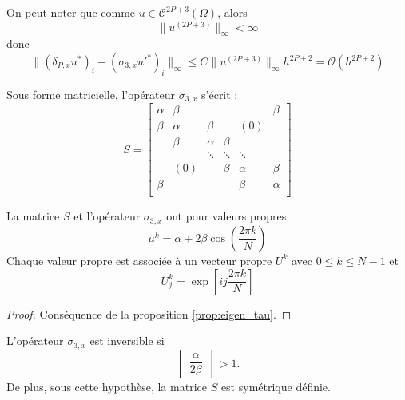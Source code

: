 On peut noter que comme $u \in \mathcal{C}^{2P+3}(\Omega)$, alors 
\begin{equation}
\|u^{(2P+3)} \|_{\infty} < \infty
\end{equation}
donc 
\begin{equation}
\| (\delta_{P,x}u^*)_i - (\sigma_{3,x} u'^*)_i \|_{\infty} \leq C \|u^{(2P+3)} \|_{\infty} h^{2P+2} = \mathcal{O}(h^{2P+2})
\label{eq:eq_cons}
\end{equation}

Sous forme matricielle, l'opérateur $\sigma_{3,x}$ s'écrit :
\begin{equation}
S = \begin{bmatrix}
\alpha    & \beta    &    &    &     & \beta \\
\beta   & \alpha    & \beta  &    & (0) &    \\
     & \beta   & \alpha  & \beta  &     &    \\
     &      & \ddots  & \ddots  & \ddots    &    \\
     & (0)  &    & \beta & \alpha   & \beta  \\
\beta    &      &    &    & \beta  & \alpha  \\
\end{bmatrix}
\label{eq:matrice_T}
\end{equation}

\begin{proposition}
La matrice $S$ et l'opérateur $\sigma_{3,x}$ ont pour valeurs propres 
\begin{equation}
\mu^k = \alpha + 2 \beta \cos \left( \dfrac{2 \pi k}{N} \right)
\end{equation}
Chaque valeur propre est associée à un vecteur propre $U^k$ avec $0 \leq k \leq N-1$ et 
\begin{equation}
U^k_j = \exp \left[ ij \dfrac{2 \pi k}{N} \right]
\end{equation}
\label{prop:eigen_implicit_herm}
\end{proposition}

\begin{proof}
Conséquence de la proposition \ref{prop:eigen_tau}. 
\end{proof}

\begin{corollaire}
L'opérateur $\sigma_{3,x}$ est inversible si 
\begin{equation}
\begin{vmatrix}
\dfrac{\alpha}{2 \beta}
\end{vmatrix} > 1.
\end{equation}
De plus, sous cette hypothèse, la matrice $S$ est symétrique définie.
\end{corollaire}

